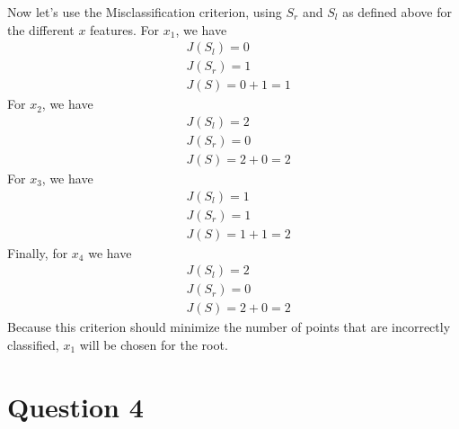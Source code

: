 \documentclass[leqno]{article}
\begin{document}
\noindent Now let's use the Misclassification criterion, using $S_r$ and $S_l$ as defined above for the different $x$ features. 
For $x_1$, we have
\begin{equation*}
\begin{split}
&J(S_l) = 0\\
&J(S_r) = 1\\
&J(S) = 0 + 1 = 1
\end{split}
\end{equation*}
For $x_2$, we have
\begin{equation*}
\begin{split}
&J(S_l) = 2\\
&J(S_r) = 0\\
&J(S) = 2 + 0 = 2
\end{split}
\end{equation*}
For $x_3$, we have
\begin{equation*}
\begin{split}
&J(S_l) = 1\\
&J(S_r) = 1\\
&J(S) = 1 + 1 = 2
\end{split}
\end{equation*}
Finally, for $x_4$ we have
\begin{equation*}
\begin{split}
&J(S_l) = 2\\
&J(S_r) = 0\\
&J(S) = 2 + 0 = 2
\end{split}
\end{equation*}
Because this criterion should minimize the number of points that are incorrectly classified, $x_1$ will be chosen for the root.

\hfill

\section*{Question 4} %


\hfill
\end{document}
